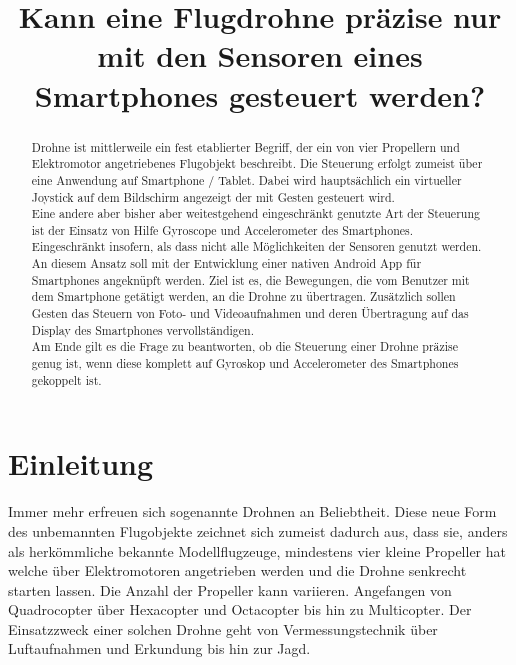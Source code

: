 \documentclass{article}
\title{Kann eine Flugdrohne präzise nur mit den Sensoren eines Smartphones gesteuert werden?}
\begin{document}
\maketitle
\begin{abstract}
Drohne ist mittlerweile ein fest etablierter Begriff, der ein von vier Propellern und Elektromotor angetriebenes Flugobjekt beschreibt. Die Steuerung erfolgt zumeist über eine Anwendung auf Smartphone / Tablet. Dabei wird hauptsächlich ein virtueller Joystick auf dem Bildschirm angezeigt der mit Gesten gesteuert wird.\\ Eine andere aber bisher aber weitestgehend eingeschränkt genutzte Art der Steuerung ist der Einsatz von Hilfe Gyroscope und Accelerometer des Smartphones. Eingeschränkt insofern, als dass nicht alle Möglichkeiten der Sensoren genutzt werden. An diesem Ansatz soll mit der Entwicklung einer nativen Android App für Smartphones angeknüpft werden. Ziel ist es, die Bewegungen, die vom Benutzer mit dem Smartphone getätigt werden, an die Drohne zu übertragen. Zusätzlich sollen Gesten das Steuern von Foto- und Videoaufnahmen und deren Übertragung auf das Display des Smartphones vervollständigen.\\ Am Ende gilt es die Frage zu beantworten, ob die Steuerung einer Drohne präzise genug ist, wenn diese komplett auf Gyroskop und Accelerometer des Smartphones gekoppelt ist.

\end{abstract}

\section{Einleitung}
\label{sec:einleitung}
Immer mehr erfreuen sich sogenannte Drohnen an Beliebtheit. Diese neue Form des unbemannten Flugobjekte zeichnet sich zumeist dadurch aus, dass sie, anders als herkömmliche bekannte Modellflugzeuge, mindestens vier kleine Propeller hat welche über Elektromotoren angetrieben werden und die Drohne senkrecht starten lassen. Die Anzahl der Propeller kann variieren. Angefangen von Quadrocopter über Hexacopter und Octacopter bis hin zu Multicopter. Der Einsatzzweck einer solchen Drohne geht von Vermessungstechnik über Luftaufnahmen und Erkundung bis hin zur Jagd.
\end{document}
